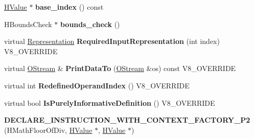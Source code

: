 \begin{DoxyCompactItemize}
\item 
\hypertarget{classv8_1_1internal_1_1_v8___f_i_n_a_l_a6c6ce68b8a929b064fe85ae27bf64927}{}\hyperlink{classv8_1_1internal_1_1_h_value}{H\+Value} $\ast$ {\bfseries base\+\_\+index} () const \label{classv8_1_1internal_1_1_v8___f_i_n_a_l_a6c6ce68b8a929b064fe85ae27bf64927}

\item 
\hypertarget{classv8_1_1internal_1_1_v8___f_i_n_a_l_a2f1fdf9c2fb8c6e5932e2dcb327e42c5}{}H\+Bounds\+Check $\ast$ {\bfseries bounds\+\_\+check} ()\label{classv8_1_1internal_1_1_v8___f_i_n_a_l_a2f1fdf9c2fb8c6e5932e2dcb327e42c5}

\item 
\hypertarget{classv8_1_1internal_1_1_v8___f_i_n_a_l_a6c6d1f37f40b113d8f4062f1ffff7215}{}virtual \hyperlink{classv8_1_1internal_1_1_representation}{Representation} {\bfseries Required\+Input\+Representation} (int index) V8\+\_\+\+O\+V\+E\+R\+R\+I\+D\+E\label{classv8_1_1internal_1_1_v8___f_i_n_a_l_a6c6d1f37f40b113d8f4062f1ffff7215}

\item 
\hypertarget{classv8_1_1internal_1_1_v8___f_i_n_a_l_ac450dad970b14246be761ccf5004924b}{}virtual \hyperlink{classv8_1_1internal_1_1_o_stream}{O\+Stream} \& {\bfseries Print\+Data\+To} (\hyperlink{classv8_1_1internal_1_1_o_stream}{O\+Stream} \&os) const V8\+\_\+\+O\+V\+E\+R\+R\+I\+D\+E\label{classv8_1_1internal_1_1_v8___f_i_n_a_l_ac450dad970b14246be761ccf5004924b}

\item 
\hypertarget{classv8_1_1internal_1_1_v8___f_i_n_a_l_aa38d0bfa11ff102b029e933d42ff6107}{}virtual int {\bfseries Redefined\+Operand\+Index} () V8\+\_\+\+O\+V\+E\+R\+R\+I\+D\+E\label{classv8_1_1internal_1_1_v8___f_i_n_a_l_aa38d0bfa11ff102b029e933d42ff6107}

\item 
\hypertarget{classv8_1_1internal_1_1_v8___f_i_n_a_l_a7126cc998f93ad5f84e3a04eef6d7b9e}{}virtual bool {\bfseries Is\+Purely\+Informative\+Definition} () V8\+\_\+\+O\+V\+E\+R\+R\+I\+D\+E\label{classv8_1_1internal_1_1_v8___f_i_n_a_l_a7126cc998f93ad5f84e3a04eef6d7b9e}

\item 
\hypertarget{classv8_1_1internal_1_1_v8___f_i_n_a_l_ad0fd5cd8b7701d9638a9bf68bc736cb1}{}{\bfseries D\+E\+C\+L\+A\+R\+E\+\_\+\+I\+N\+S\+T\+R\+U\+C\+T\+I\+O\+N\+\_\+\+W\+I\+T\+H\+\_\+\+C\+O\+N\+T\+E\+X\+T\+\_\+\+F\+A\+C\+T\+O\+R\+Y\+\_\+\+P2} (H\+Math\+Floor\+Of\+Div, \hyperlink{classv8_1_1internal_1_1_h_value}{H\+Value} $\ast$, \hyperlink{classv8_1_1internal_1_1_h_value}{H\+Value} $\ast$)\label{classv8_1_1internal_1_1_v8___f_i_n_a_l_ad0fd5cd8b7701d9638a9bf68bc736cb1}


\end{DoxyCompactItemize}

